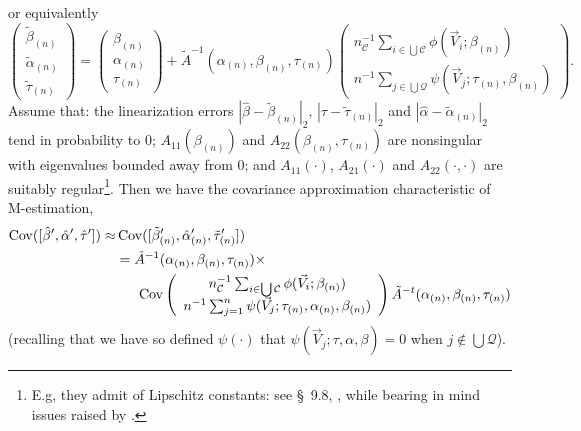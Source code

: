\documentclass{article}
\begin{document}
or equivalently
\begin{equation*}
\left(\begin{array}{c}\tilde{\beta}_{(n)}\\ \tilde{\alpha}_{(n)}\\ \tilde{\tau}_{(n)} \end{array}\right)
    = \left(\begin{array}{c}\beta_{(n)} \\\alpha_{(n)}\\
                    \tau_{(n)} \end{array}\right)
    + \tilde{A}^{-1}(\alpha_{(n)}, \beta_{(n)}, \tau_{(n)})\left(
    \begin{array}{c}
      n_{\mathcal{C}}^{-1}\sum_{i\in \bigcup
      \mathcal{C}}\phi(\vec{V}_{i}; \beta_{(n)})\\
      n^{-1}\sum_{j\in \bigcup
                 \mathcal{Q}}\psi(\vec{V}_{j};
                 \tau_{(n)},\beta_{(n)} )
    \end{array}
\right).
\end{equation*}
Assume that: the linearization errors $|\hat\beta -\tilde{\beta}_{(n)}|_{2}$,
$|\hat\tau -\tilde{\tau}_{(n)}|_{2}$ and $|\hat{\alpha} - \tilde{\alpha}_{(n)}|_{2}$ tend in probability to 0;
$A_{11}(\beta_{(n)})$ and $A_{22}(\beta_{(n)}, \tau_{(n)})$ are nonsingular
with eigenvalues bounded away from 0; and $A_{11}(\cdot)$, $A_{21}(\cdot)$ and $A_{22}(\cdot, \cdot)$ are suitably
regular\footnote{E.g, they admit of Lipschitz constants: see \S~9.8,
  , while bearing in mind issues raised
  by .}.
Then we have the covariance approximation characteristic of M-estimation,
\begin{align*} \operatorname{Cov}([\hat\beta',\hat{\alpha}', \hat\tau']) \approx&
  \operatorname{Cov}([\tilde{\beta}_{(n)}',\hat{\alpha}_{(n)}',\tilde{\tau}_{(n)}'])\\
  &=
    \tilde{A}^{-1}(\alpha_{(n)}, \beta_{(n)}, \tau_{(n)}) \times \\
  &\hspace{1.5em} \operatorname{Cov}\left(
     \begin{array}{c}
       n_{\mathcal{C}}^{-1}\sum_{i\in \bigcup \mathcal{C}}\phi(\vec{V}_{i}; \beta_{(n)} )\\
       n^{-1}\sum_{j=1}^{n}\psi(\vec{V}_{j}; \tau_{(n)}, \alpha_{(n)}, \beta_{(n)} )
     \end{array}
    \right)
  \tilde{A}^{-t}(\alpha_{(n)}, \beta_{(n)}, \tau_{(n)})
\end{align*}
(recalling that we have so defined $\psi(\cdot)$ that $\psi(\vec{V}_{j}; \tau, \alpha, \beta) = 0$ when
$j\not\in \bigcup \mathcal{Q}$).
\end{document}
